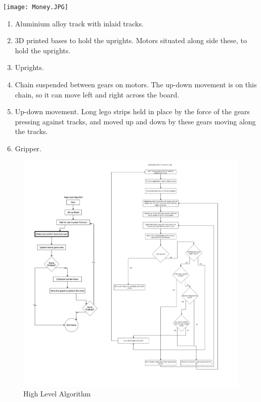 \documentclass[onecolumn]{IEEEtran}
\begin{document}
\begin{center}
\begin{minipage}[c]{.5\textwidth}
  \texttt{[image: Money.JPG]}
   \label{fig:money}
\end{minipage}
\begin{minipage}[c]{.45\textwidth}
\begin{enumerate}
\item Aluminium alloy track with inlaid tracks.
\item 3D printed bases to hold the uprights. Motors situated along side these, to hold the uprights. 
\item Uprights. 
\item Chain suspended between gears on motors. The up-down movement is on this chain, so it can move left and right across the board. 
\item Up-down movement. Long lego strips held in place by the force of the gears pressing against tracks, and moved up and down by these gears moving along the tracks. 
\item Gripper. 
\end{enumerate}
\end{minipage}
\end{center}

\begin{figure}[h!]
  \caption{High Level Algorithm}
  \centering
  \includegraphics[scale = .3]{bws.jpg}
\end{figure}
\end{document}
